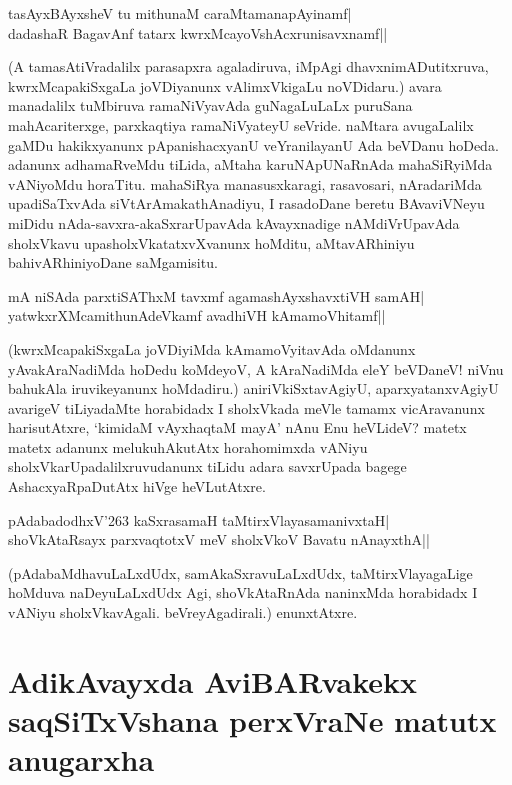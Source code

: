 \begin{shloka} 
tasAyxBAyxsheV tu mithunaM caraMtamanapAyinamf|\label{156a}\\ 
dadashaR BagavAnf tatarx kwrxMcayoVshAcxrunisavxnamf||
\end{shloka} 

(A tamasAtiVradalilx parasapxra agaladiruva, iMpAgi dhavxnimADutitxruva, kwrxMcapakiSxgaLa joVDiyanunx vAlimxVkigaLu noVDidaru.) avara manadalilx tuMbiruva ramaNiVyavAda guNagaLuLaLx puruSana mahAcariterxge, parxkaqtiya ramaNiVyateyU seVride. naMtara avugaLalilx gaMDu hakikxyanunx pApanishacxyanU veYranilayanU Ada beVDanu hoDeda. adanunx adhamaRveMdu tiLida, aMtaha karuNApUNaRnAda mahaSiRyiMda vANiyoMdu horaTitu. mahaSiRya manasusxkaragi, rasavosari, nAradariMda upadiSaTxvAda siVtArAmakathAnadiyu, I rasadoDane beretu BAvaviVNeyu miDidu nAda-savxra-akaSxrarUpavAda kAvayxnadige nAMdiVrUpavAda sholxVkavu upasholxVkatatxvXvanunx hoMditu, aMtavARhiniyu bahivARhiniyoDane saMgamisitu. 

\begin{shloka} 
mA niSAda parxtiSAThxM tavxmf agamashAyxshavxtiVH samAH|\label{157b}\\ 
yatwkxrXMcamithunAdeVkamf avadhiVH kAmamoVhitamf||
\end{shloka} 

(kwrxMcapakiSxgaLa joVDiyiMda kAmamoVyitavAda oMdanunx yAvakAraNadiMda hoDedu koMdeyoV, A kAraNadiMda eleY beVDaneV! niVnu bahukAla iruvikeyanunx hoMdadiru.) aniriVkiSxtavAgiyU, aparxyatanxvAgiyU avarigeV tiLiyadaMte horabidadx I sholxVkada meVle tamamx vicAravanunx harisutAtxre, `kimidaM vAyxhaqtaM mayA'\label{157} nAnu Enu heVLideV? matetx matetx adanunx melukuhAkutAtx horahomimxda vANiyu sholxVkarUpadalilxruvudanunx tiLidu adara savxrUpada bagege AshacxyaRpaDutAtx hiVge heVLutAtxre. 

\begin{shloka} 
pAdabadodhxV\char'263 kaSxrasamaH taMtirxVlayasamanivxtaH|\label{157a}\\ 
shoVkAtaRsayx parxvaqtotxV meV sholxVkoV Bavatu nAnayxthA||
\end{shloka}

(pAdabaMdhavuLaLxdUdx, samAkaSxravuLaLxdUdx, taMtirxVlayagaLige hoMduva naDeyuLaLxdUdx Agi, shoVkAtaRnAda naninxMda horabidadx I vANiyu sholxVkavAgali. beVreyAgadirali.) enunxtAtxre. 

\section*{AdikAvayxda AviBARvakekx saqSiTxVshana perxVraNe matutx anugarxha} 

